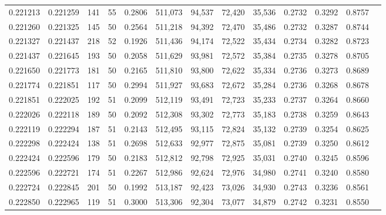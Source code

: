 \begin{tabular}{rrrrrrrrrrrrr}
0.221213 & 0.221259 &   141 &  55 &                                     0.2806 & 511,073 &  94,537 &  72,420 &  35,536 & 0.2732 & 0.3292 & 0.8757 \\
0.221260 & 0.221325 &   145 &  50 &                                     0.2564 & 511,218 &  94,392 &  72,470 &  35,486 & 0.2732 & 0.3287 & 0.8744 \\
0.221327 & 0.221437 &   218 &  52 &                                     0.1926 & 511,436 &  94,174 &  72,522 &  35,434 & 0.2734 & 0.3282 & 0.8723 \\
0.221437 & 0.221645 &   193 &  50 &                                     0.2058 & 511,629 &  93,981 &  72,572 &  35,384 & 0.2735 & 0.3278 & 0.8705 \\
0.221650 & 0.221773 &   181 &  50 &                                     0.2165 & 511,810 &  93,800 &  72,622 &  35,334 & 0.2736 & 0.3273 & 0.8689 \\
0.221774 & 0.221851 &   117 &  50 &                                     0.2994 & 511,927 &  93,683 &  72,672 &  35,284 & 0.2736 & 0.3268 & 0.8678 \\
0.221851 & 0.222025 &   192 &  51 &                                     0.2099 & 512,119 &  93,491 &  72,723 &  35,233 & 0.2737 & 0.3264 & 0.8660 \\
0.222026 & 0.222118 &   189 &  50 &                                     0.2092 & 512,308 &  93,302 &  72,773 &  35,183 & 0.2738 & 0.3259 & 0.8643 \\
0.222119 & 0.222294 &   187 &  51 &                                     0.2143 & 512,495 &  93,115 &  72,824 &  35,132 & 0.2739 & 0.3254 & 0.8625 \\
0.222298 & 0.222424 &   138 &  51 &                                     0.2698 & 512,633 &  92,977 &  72,875 &  35,081 & 0.2739 & 0.3250 & 0.8612 \\
0.222424 & 0.222596 &   179 &  50 &                                     0.2183 & 512,812 &  92,798 &  72,925 &  35,031 & 0.2740 & 0.3245 & 0.8596 \\
0.222596 & 0.222721 &   174 &  51 &                                     0.2267 & 512,986 &  92,624 &  72,976 &  34,980 & 0.2741 & 0.3240 & 0.8580 \\
0.222724 & 0.222845 &   201 &  50 &                                     0.1992 & 513,187 &  92,423 &  73,026 &  34,930 & 0.2743 & 0.3236 & 0.8561 \\
0.222850 & 0.222965 &   119 &  51 &                                     0.3000 & 513,306 &  92,304 &  73,077 &  34,879 & 0.2742 & 0.3231 & 0.8550 \\

\end{tabular}

